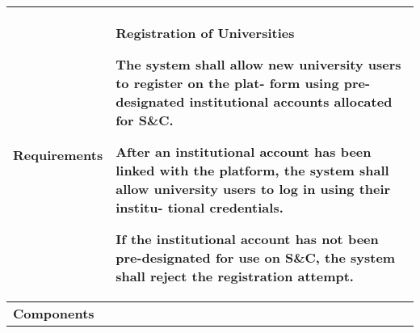 \begin{table}[h]
    \centering
    \renewcommand{\arraystretch}{1.5} %
    \begin{tabular}{|C{0.3\textwidth}|L{0.65\textwidth}|} %
        \hline
        \textbf{Requirements} & 
        \textbf{Registration of Universities} \par
        [FR10] The system shall allow new university users to register on the plat-
        form using pre-designated institutional accounts allocated for S\&C. \par
        [FR11] After an institutional account has been linked with the platform,
        the system shall allow university users to log in using their institu-
        tional credentials. \par
        [FR12] If the institutional account has not been pre-designated for use on
        S\&C, the system shall reject the registration attempt. \\
        \hline
        \textbf{Components} & 
        \\
        \hline
    \end{tabular}
\end{table}


